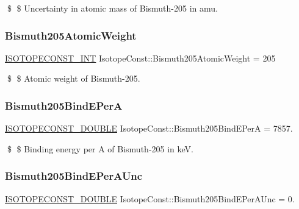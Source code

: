 \$ \$ Uncertainty in atomic mass of Bismuth-\/205 in amu. \mbox{\label{group___isotope_const-_bismuth-_bi205_ga17a820421cdd5d4edfab94bdffae6700}} 
\subsubsection{\texorpdfstring{Bismuth205\+Atomic\+Weight}{Bismuth205AtomicWeight}}
{\footnotesize\ttfamily \mbox{\hyperlink{group___isotope_const-_macros_ga5f18360b3e99483a35c32d789e62621c}{I\+S\+O\+T\+O\+P\+E\+C\+O\+N\+S\+T\+\_\+\+I\+NT}} Isotope\+Const\+::\+Bismuth205\+Atomic\+Weight = 205}

\$ \$ Atomic weight of Bismuth-\/205. \mbox{\label{group___isotope_const-_bismuth-_bi205_ga1244dd72fdb55c3553354cea049bd8d4}} 
\subsubsection{\texorpdfstring{Bismuth205\+Bind\+E\+PerA}{Bismuth205BindEPerA}}
{\footnotesize\ttfamily \mbox{\hyperlink{group___isotope_const-_macros_ga8f45a7272ce02c0b4c65c44636ed719a}{I\+S\+O\+T\+O\+P\+E\+C\+O\+N\+S\+T\+\_\+\+D\+O\+U\+B\+LE}} Isotope\+Const\+::\+Bismuth205\+Bind\+E\+PerA = 7857.}

\$ \$ Binding energy per A of Bismuth-\/205 in keV. \mbox{\label{group___isotope_const-_bismuth-_bi205_ga1bd710420520f45518ffc54f5a58cb81}} 
\subsubsection{\texorpdfstring{Bismuth205\+Bind\+E\+Per\+A\+Unc}{Bismuth205BindEPerAUnc}}
{\footnotesize\ttfamily \mbox{\hyperlink{group___isotope_const-_macros_ga8f45a7272ce02c0b4c65c44636ed719a}{I\+S\+O\+T\+O\+P\+E\+C\+O\+N\+S\+T\+\_\+\+D\+O\+U\+B\+LE}} Isotope\+Const\+::\+Bismuth205\+Bind\+E\+Per\+A\+Unc = 0.}

